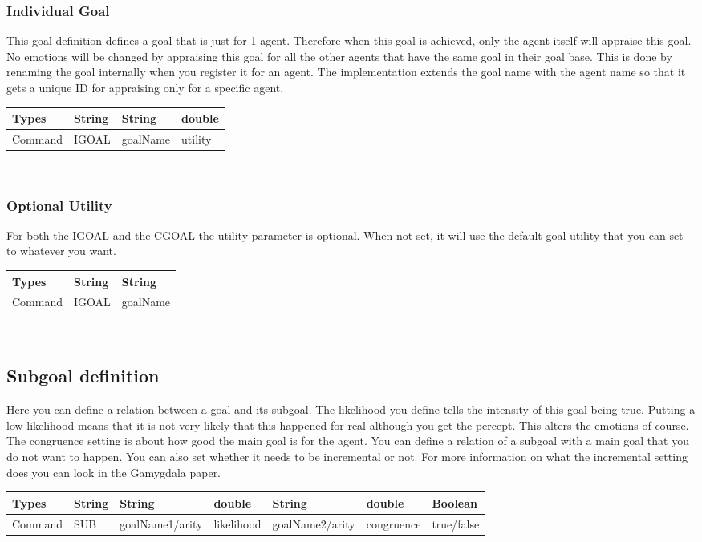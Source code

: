 \documentclass{scrartcl}
\begin{document}
\subsubsection{Individual Goal}
This goal definition defines a goal that is just for 1 agent. Therefore when this goal is achieved, only the agent itself will appraise this goal. No emotions will be changed by appraising this goal for all the other agents that have the same goal in their goal base. This is done by renaming the goal internally when you register it for an agent. The implementation extends the goal name with the agent name so that it gets a unique ID for appraising only for a specific agent.\\
\begin{tabular}{|l|l|l|l|}
\hline  Types& String & String & double \\ 
\hline  Command & IGOAL & goalName & utility\\ 
\hline 
\end{tabular}
\\

\subsubsection{Optional Utility}
For both the IGOAL and the CGOAL the utility parameter is optional. When not set, it will use the default goal utility that you can set to whatever you want.\\
\begin{tabular}{|l|l|l|}
	\hline  Types& String & String  \\ 
	\hline  Command & IGOAL & goalName \\ 
	\hline 
\end{tabular}
\\


\subsection{Subgoal definition}
Here you can define a relation between a goal and its subgoal. The likelihood you define tells the intensity of this goal being true. Putting a low likelihood means that it is not very likely that this happened for real although you get the percept. This alters the emotions of course. The congruence setting is about how good the main goal is for the agent. You can define a relation of a subgoal with a main goal that you do not want to happen. You can also set whether it needs to be incremental or not. For more information on what the incremental setting does you can look in the Gamygdala paper.\\
\begin{tabular}{|l|l|l|l|l|l|l|}
	\hline  Types& String & String & double & String & double & Boolean \\ 
	\hline  Command & SUB & goalName1/arity & likelihood & goalName2/arity & congruence & true/false\\ 
	\hline 
\end{tabular} 
\\
\end{document}
